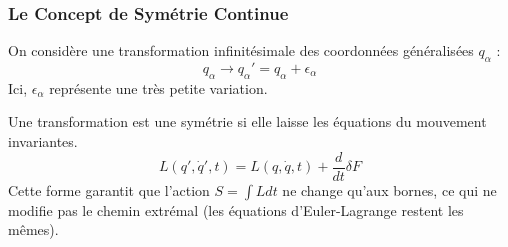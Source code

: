 \documentclass[french]{yLectureNote}
\newcommand{\dd}{\mathrm{d}}
\begin{document}






\subsubsection{Le Concept de Symétrie Continue}
On considère une transformation infinitésimale des coordonnées généralisées $q_\alpha$ :
$$q_\alpha \to q_\alpha' = q_\alpha + \epsilon_\alpha$$
Ici, $\epsilon_\alpha$ représente une très petite variation. 


Une transformation est une symétrie si elle laisse les équations du mouvement invariantes.
$$L(q', \dot{q}', t) = L(q, \dot{q}, t) + \frac{d}{dt}\delta F$$
Cette forme garantit que l'action $S = \int L dt$ ne change qu'aux bornes, ce qui ne modifie pas le chemin extrémal (les équations d'Euler-Lagrange restent les mêmes).
\end{document}
